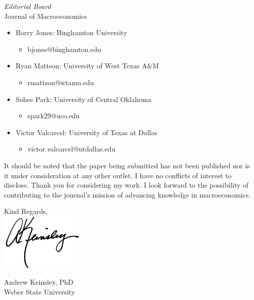 \documentclass[foldmarks=false, backaddress=off,fromemail,firstfoot=true,12pt]{scrlttr2}
\begin{document}
\begin{letter}{{\it Editorial Board} \\ Journal of Macroeconomics}
\begin{itemize}
	\item Barry Jones: Binghamton University
	\begin{itemize}
		\item bjones@binghamton.edu
	\end{itemize}
	\item Ryan Mattson: University of West Texas A\&M
	\begin{itemize}
		\item rmattson@wtamu.edu
	\end{itemize}
	\item Sohee Park: University of Central Oklahoma
	\begin{itemize}
		\item spark29@uco.edu
	\end{itemize}
	\item Victor Valcarcel: University of Texas at Dallas
	\begin{itemize}
		\item victor.valcarcel@utdallas.edu
	\end{itemize}
\end{itemize}

It should be noted that the paper being submitted has not been published nor is it under consideration at any other outlet.
I have no conflicts of interest to disclose.
Thank you for considering my work. I look forward to the possibility of contributing to the journal's mission of advancing knowledge in macroeconomics.


\vspace{2em}
\noindent Kind Regards, \\
\includegraphics[width=0.3\textwidth]{Signature.png} 

\vspace{-.4in}
\noindent Andrew Keinsley, PhD\\
Weber State University



\end{letter}
\end{document}
